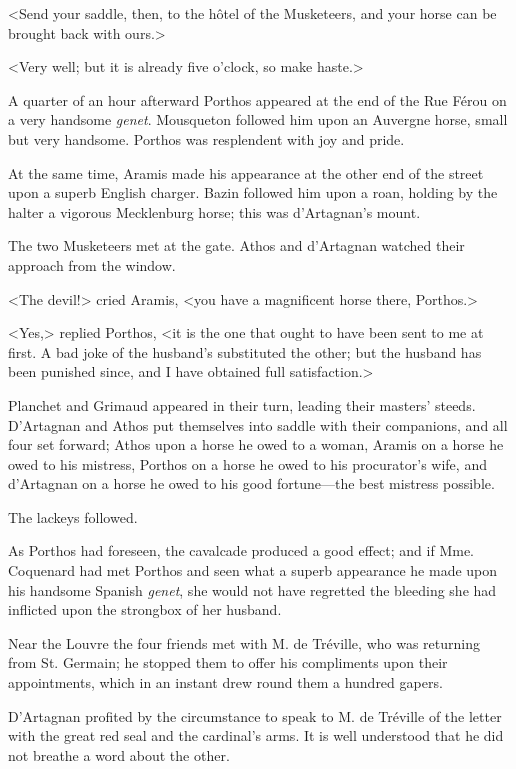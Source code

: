 <Send your saddle, then, to the hôtel of the Musketeers, and your horse can be brought back with ours.> 

<Very well; but it is already five o'clock, so make haste.> 

A quarter of an hour afterward Porthos appeared at the end of the Rue Férou on a very handsome \textit{genet}. Mousqueton followed him upon an Auvergne horse, small but very handsome. Porthos was resplendent with joy and pride. 

At the same time, Aramis made his appearance at the other end of the street upon a superb English charger. Bazin followed him upon a roan, holding by the halter a vigorous Mecklenburg horse; this was d'Artagnan's mount. 

The two Musketeers met at the gate. Athos and d'Artagnan watched their approach from the window. 

<The devil!> cried Aramis, <you have a magnificent horse there, Porthos.> 

<Yes,> replied Porthos, <it is the one that ought to have been sent to me at first. A bad joke of the husband's substituted the other; but the husband has been punished since, and I have obtained full satisfaction.> 

Planchet and Grimaud appeared in their turn, leading their masters' steeds. D'Artagnan and Athos put themselves into saddle with their companions, and all four set forward; Athos upon a horse he owed to a woman, Aramis on a horse he owed to his mistress, Porthos on a horse he owed to his procurator's wife, and d'Artagnan on a horse he owed to his good fortune---the best mistress possible. 

The lackeys followed. 

As Porthos had foreseen, the cavalcade produced a good effect; and if Mme. Coquenard had met Porthos and seen what a superb appearance he made upon his handsome Spanish \textit{genet}, she would not have regretted the bleeding she had inflicted upon the strongbox of her husband. 

Near the Louvre the four friends met with M. de Tréville, who was returning from St. Germain; he stopped them to offer his compliments upon their appointments, which in an instant drew round them a hundred gapers. 

D'Artagnan profited by the circumstance to speak to M. de Tréville of the letter with the great red seal and the cardinal's arms. It is well understood that he did not breathe a word about the other. 

